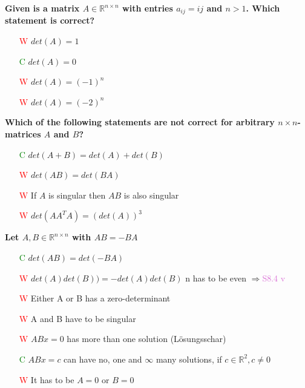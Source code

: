\documentclass[7pt,landscape, margin = 0.1mm]{article}
\begin{document}
\begin{multicols}{4}
\begin{flushleft}
\textbf{ Given is a matrix $A  \in \mathbb{R}^{n \times n} $ with entries $a_{ij} = ij$ and $n > 1$. Which statement is correct?  }
\begin{itemize}
\item[\textcolor{red}{W}]  $det(A) = 1 $
\item[\textcolor{green}{C}]  $det(A) = 0 $
\item[\textcolor{red}{W}]  $det(A) = (-1)^n $
\item[\textcolor{red}{W}]  $det(A) = (-2)^n $
\end{itemize}
\textbf{ Which of the following statements are not correct for arbitrary $n \times n$-matrices $A$ and $B$? }
\begin{itemize}
\item[\textcolor{green}{C}]  $det(A+B) = det(A)+det(B) $
\item[\textcolor{red}{W}] $det(AB) = det(BA) $
\item[\textcolor{red}{W}] If $ A$ is singular then $AB$ is also singular
\item[\textcolor{red}{W}]  $det(AA^TA) =(det(A))^3$

\end{itemize}
\hspace{3mm}


\textbf{Let $A,B  \in \mathbb{R}^{n \times n} $ with $AB =-BA $ }
\begin{itemize}
\item[\textcolor{green}{C}] $det(AB) = det(-BA) $
\item[\textcolor{red}{W}] $det(A)det(B)) = - det(A)det(B)$
\textcolor{Emerald}{n has to be even $\Rightarrow $\textcolor{Orchid}{S8.4 v}}
\item[\textcolor{red}{W}] Either A or B has a zero-determinant
\item[\textcolor{red}{W}] A and B have to be singular
\item[\textcolor{red}{W}] $ABx=0$ has more than one solution (Lösungsschar)
\item[\textcolor{green}{C}] $ABx=c$ can have no, one and $\infty$ many solutions, if $c \in \mathbb{R}^2, c\neq 0$
\item[\textcolor{red}{W}] It has to be $A=0$ or $B=0$

\end{itemize}


\hspace{3mm}



\end{flushleft}
\end{multicols}
\end{document}
